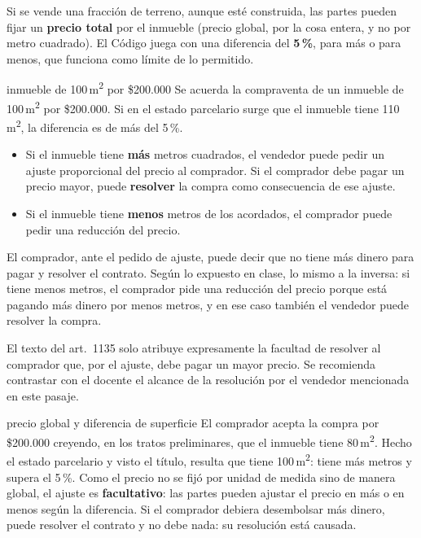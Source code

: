 \documentclass[12pt,oneside]{book}
\begin{document}
Si se vende una fracci\'on de terreno, aunque est\'e construida, las partes pueden fijar un \textbf{precio total} por el inmueble (precio global, por la cosa entera, y no por metro cuadrado). El C\'odigo juega con una diferencia del \textbf{5\,\%}, para m\'as o para menos, que funciona como l\'imite de lo permitido.

\begin{example}{inmueble de 100\,m\textsuperscript{2} por \$200.000}
Se acuerda la compraventa de un inmueble de 100\,m\textsuperscript{2} por \$200.000. Si en el estado parcelario surge que el inmueble tiene 110\,m\textsuperscript{2}, la diferencia es de m\'as del 5\,\%.
\end{example}

\begin{itemize}
    \item Si el inmueble tiene \textbf{m\'as} metros cuadrados, el vendedor puede pedir un ajuste proporcional del precio al comprador. Si el comprador debe pagar un precio mayor, puede \textbf{resolver} la compra como consecuencia de ese ajuste.
    \item Si el inmueble tiene \textbf{menos} metros de los acordados, el comprador puede pedir una reducci\'on del precio.
\end{itemize}

El comprador, ante el pedido de ajuste, puede decir que no tiene m\'as dinero para pagar y resolver el contrato. Seg\'un lo expuesto en clase, lo mismo a la inversa: si tiene menos metros, el comprador pide una reducci\'on del precio porque est\'a pagando m\'as dinero por menos metros, y en ese caso tambi\'en el vendedor puede resolver la compra.

\begin{note}
El texto del art.~1135 solo atribuye expresamente la facultad de resolver al comprador que, por el ajuste, debe pagar un mayor precio. Se recomienda contrastar con el docente el alcance de la resoluci\'on por el vendedor mencionada en este pasaje.
\end{note}


\begin{example}{precio global y diferencia de superficie}
El comprador acepta la compra por \$200.000 creyendo, en los tratos preliminares, que el inmueble tiene 80\,m\textsuperscript{2}. Hecho el estado parcelario y visto el t\'itulo, resulta que tiene 100\,m\textsuperscript{2}: tiene m\'as metros y supera el 5\,\%. Como el precio no se fij\'o por unidad de medida sino de manera global, el ajuste es \textbf{facultativo}: las partes pueden ajustar el precio en m\'as o en menos seg\'un la diferencia. Si el comprador debiera desembolsar m\'as dinero, puede resolver el contrato y no debe nada: su resoluci\'on est\'a causada.
\end{example}
\end{document}
